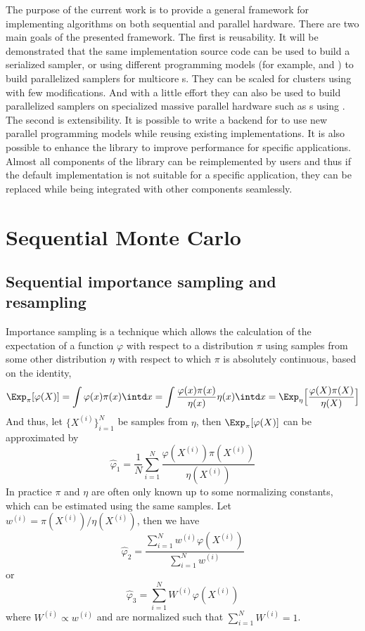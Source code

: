 \documentclass[11pt,bib,hyper]{marticle}
\begin{document}
The purpose of the current work is to provide a general framework for
implementing \smc algorithms on both sequential and parallel hardware. There
are two main goals of the presented framework. The first is reusability. It
will be demonstrated that the same implementation source code can be used to
build a serialized sampler, or using different programming models (for
example, \openmp and \tbb) to build parallelized samplers for multicore
\cpu{}s. They can be scaled for clusters using \mpi with few modifications.
And with a little effort they can also be used to build parallelized samplers
on specialized massive parallel hardware such as \gpu{}s using \opencl. The
second is extensibility. It is possible to write a backend for \vsmc to use
new parallel programming models while reusing existing implementations. It is
also possible to enhance the library to improve performance for specific
applications. Almost all components of the library can be reimplemented by
users and thus if the default implementation is not suitable for a specific
application, they can be replaced while being integrated with other components
seamlessly.

\section{Sequential Monte Carlo}
\label{sec:Sequential Monte Carlo}

\subsection{Sequential importance sampling and resampling}
\label{sub:Sequential importance sampling and resampling}

Importance sampling is a technique which allows the calculation of the
expectation of a function $\varphi$ with respect to a distribution $\pi$ using
samples from some other distribution $\eta$ with respect to which $\pi$ is
absolutely continuous, based on the identity,
\begin{equation}
  \Exp_{\pi}[\varphi(X)]
  = \int\varphi(x)\pi(x)\intd x
  = \int\frac{\varphi(x)\pi(x)}{\eta(x)}\eta(x)\intd x
  = \Exp_{\eta}\Bigl[\frac{\varphi(X)\pi(X)}{\eta(X)}\Bigr]
\end{equation}
And thus, let $\{X^{(i)}\}_{i=1}^N$ be samples from $\eta$, then
$\Exp_{\pi}[\varphi(X)]$ can be approximated by
\begin{equation}
  \hat\varphi_1 =
  \frac{1}{N}\sum_{i=1}^N\frac{\varphi(X^{(i)})\pi(X^{(i)})}{\eta(X^{(i)})}
\end{equation}
In practice $\pi$ and $\eta$ are often only known up to some normalizing
constants, which can be estimated using the same samples. Let $w^{(i)} =
\pi(X^{(i)})/\eta(X^{(i)})$, then we have
\begin{equation}
  \hat\varphi_2 =
  \frac{\sum_{i=1}^Nw^{(i)}\varphi(X^{(i)})}{\sum_{i=1}^Nw^{(i)}}
\end{equation}
or
\begin{equation}
  \hat\varphi_3 = \sum_{i=1}^NW^{(i)}\varphi(X^{(i)})
\end{equation}
where $W^{(i)}\propto w^{(i)}$ and are normalized such that
$\sum_{i=1}^NW^{(i)} = 1$.
\end{document}
